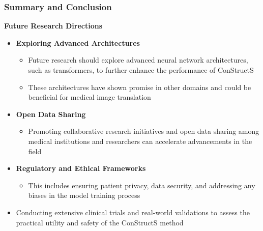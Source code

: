 \documentclass[aspectratio=169, lecture, amberg]{OTHAWbeamer}
\begin{document}
\begin{frame}
    \frametitle{Summary and Conclusion}
    \textbf{Future Research Directions}
    
    \begin{itemize}
        \item <1-> \textbf{Exploring Advanced Architectures}
        
        \begin{itemize}
            \item Future research should explore advanced neural network architectures, such as transformers, to further enhance the performance of ConStructS
            
            \item These architectures have shown promise in other domains and could be beneficial for medical image translation
            \vspace{0.2cm}
        \end{itemize}
        \item <2-> \textbf{Open Data Sharing}
        
        \begin{itemize}
            \item Promoting collaborative research initiatives and open data sharing among medical institutions and researchers can accelerate advancements in the field
            \vspace{0.2cm}
        \end{itemize}
        \item <3-> \textbf{Regulatory and Ethical Frameworks}
        
        \begin{itemize}
            \item This includes ensuring patient privacy, data security, and addressing any biases in the model training process
            \vspace{0.2cm}
        \end{itemize}
        \item <4-> Conducting extensive clinical trials and real-world validations to assess the practical utility and safety of the ConStructS method
    
    \end{itemize}
\end{frame}
\end{document}
